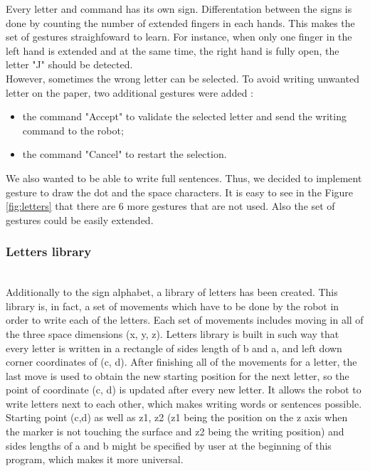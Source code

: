 Every letter and command has its own sign. Differentation between the signs is done by counting the number of extended fingers in each hands. This makes the set of gestures straighfoward to learn. For instance, when only one finger in the left hand is extended and at the same time, the right hand is fully open, the letter "J" should be detected.\\

However, sometimes the wrong letter can be selected. To avoid writing unwanted letter on the paper, two additional gestures were added :
\begin{itemize}
	\item the command "Accept" to validate the selected letter and send the writing command to the robot;
	\item the command "Cancel" to restart the selection.
\end{itemize}

We also wanted to be able to write full sentences. Thus, we decided to implement gesture to draw the dot and the space characters. It is easy to see in the Figure \ref{fig:letters} that there are 6 more gestures that are not used. Also the set of gestures could be easily extended.

\subsubsection{Letters library}

\mbox{}\\
Additionally to the sign alphabet, a library of letters has been created. This library is, in fact, a set of movements which have to be done by the robot in order to write each of the letters. Each set of movements includes moving in all of the three space dimensions (x, y, z). Letters library is built in such way that every letter is written in a rectangle of sides length of b and a, and left down corner coordinates of (c, d). After finishing all of the movements for a letter, the last move is used to obtain the new starting position for the next letter, so the point of coordinate (c, d) is updated after every new letter. It allows the robot to write letters next to each other, which makes writing words or sentences possible. Starting point (c,d) as well as z1, z2 (z1 being the position on the z axis when the marker is not touching the surface and z2 being the writing position) and sides lengths of a and b might be specified by user at the beginning of this program, which makes it more universal.\\

